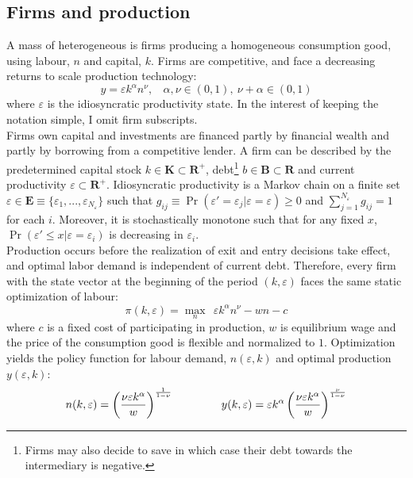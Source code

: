 \documentclass[12pt]{article}
\begin{document}
\subsection{Firms and production \label{sec:production}}

A mass of heterogeneous is firms producing a homogeneous consumption good, using labour, $n$ and capital, $k$. Firms are competitive, and face a decreasing returns to scale production technology:
\begin{equation} \label{eq:prodf}
y = \varepsilon k^{\alpha}n^{\nu}, \ \ \ \ \alpha,\nu \in (0,1),  \ \nu + \alpha \in (0,1)
\end{equation}  
where $\varepsilon$ is the idiosyncratic productivity state. In the interest of keeping the notation simple, I omit firm subscripts. \vspace{3mm} \\
Firms own capital and investments are financed partly by financial wealth and partly by borrowing from a competitive lender. A firm can be described by the predetermined capital stock $k \in \mathbf{K} \subset \mathbf{R^{+}}$, debt\footnote{Firms may also decide to save in which case their debt towards the intermediary is negative.} $b \in \mathbf{B} \subset \mathbf{R}$ and current productivity $\varepsilon \subset \mathbf{R^+}$. Idiosyncratic productivity is a Markov chain on a finite set $\varepsilon \in \mathbf{E} \equiv \{ \varepsilon_1,...,\varepsilon_{N_{\varepsilon}} \}$ such that $ g_{ij} \equiv \Pr(\varepsilon'= \varepsilon_j|\varepsilon = \varepsilon) \geq 0$ and $\sum_{j=1}^{N_{\varepsilon}} g_{ij} = 1$ for each $i$. Moreover, it is stochastically monotone such that for any fixed $x$, $\Pr(\varepsilon' \leq x | \varepsilon = \varepsilon_i)$ is decreasing in $\varepsilon_i$. \vspace{3mm} \\
Production occurs before the realization of exit and entry decisions take effect, and optimal labor demand is independent of current debt. Therefore, every firm with the state vector at the beginning of the period $(k,\varepsilon)$ faces the same static optimization of labour: 
$$ \pi(k,\varepsilon) = \max_{n} \ \  \varepsilon k^{\alpha}n^{\nu} - wn - c$$
where $c$ is a fixed cost of participating in production, $w$ is equilibrium wage and the price of the consumption good is flexible and normalized to $1$. Optimization yields the policy function for labour demand, $n(\varepsilon,k)$ and optimal production $y(\varepsilon,k)$: 
\begin{equation} \label{eq:opt_emp_prod}
n(k,\varepsilon) = \left( \dfrac{ \nu \varepsilon k^\alpha}{w} \right)^{\frac{1}{1-\nu}} \hspace{15mm}
y(k,\varepsilon) = \varepsilon k^{\alpha} \left( \dfrac{\nu \varepsilon k^\alpha}{w} \right)^{\frac{\nu}{1-\nu}}
\end{equation}  
\end{document}
